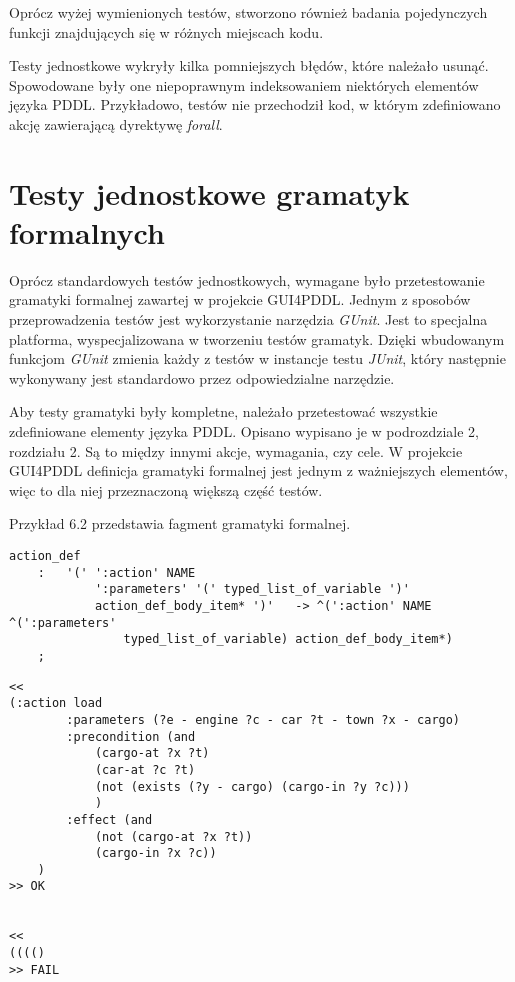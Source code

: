 Oprócz wyżej wymienionych testów, stworzono również badania pojedynczych funkcji znajdujących się w różnych miejscach kodu.

Testy jednostkowe wykryły kilka pomniejszych błędów, które należało usunąć. Spowodowane były one niepoprawnym indeksowaniem niektórych elementów języka PDDL. Przykładowo, testów nie przechodził kod, w którym zdefiniowano akcję zawierającą dyrektywę \textit{forall}.
\section{Testy jednostkowe gramatyk formalnych}
Oprócz standardowych testów jednostkowych, wymagane było przetestowanie gramatyki formalnej zawartej w projekcie GUI4PDDL. Jednym z sposobów przeprowadzenia testów jest wykorzystanie narzędzia \textit{GUnit}. Jest to specjalna platforma, wyspecjalizowana w tworzeniu testów gramatyk. Dzięki wbudowanym funkcjom \textit{GUnit} zmienia każdy z testów w instancje testu \textit{JUnit}, który następnie wykonywany jest standardowo przez odpowiedzialne narzędzie.

Aby testy gramatyki były kompletne, należało przetestować wszystkie zdefiniowane elementy języka PDDL. Opisano wypisano je w podrozdziale 2, rozdziału 2. Są to między innymi akcje, wymagania, czy cele. W projekcie GUI4PDDL definicja gramatyki formalnej jest jednym z ważniejszych elementów, więc to dla niej przeznaczoną większą część testów.

Przykład 6.2 przedstawia fagment gramatyki formalnej.


\begin{Code}
\begin{lstlisting}[language=LISP,frame=single,label=ana_code, caption=Fragment gramatyki formalnej]
action_def 
	:	'(' ':action' NAME
			':parameters' '(' typed_list_of_variable ')'
			action_def_body_item* ')'   -> ^(':action' NAME ^(':parameters' 
				typed_list_of_variable)	action_def_body_item*) 
	;
\end{lstlisting}
\end{Code}

\begin{Code}
\begin{lstlisting}[language=LISP,frame=single,label=ana_code, caption=Przykładowe testy dla przykładu 6.2]
<<
(:action load
        :parameters (?e - engine ?c - car ?t - town ?x - cargo)
        :precondition (and
            (cargo-at ?x ?t)
            (car-at ?c ?t)
            (not (exists (?y - cargo) (cargo-in ?y ?c)))
            )
        :effect (and
            (not (cargo-at ?x ?t))
            (cargo-in ?x ?c))
    )
>> OK


<<
(((()
>> FAIL
\end{lstlisting}
\end{Code}

